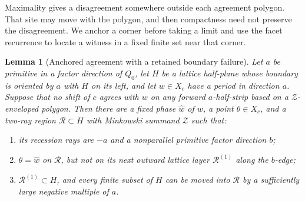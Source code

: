 \documentclass[11pt]{article}
\numberwithin{equation}{section}
\newtheorem{lemma}[theorem]{Lemma}
\theoremstyle{definition}
\theoremstyle{remark}
\newcommand{\ZZ}{\mathcal Z}
\newcommand{\RR}{\mathcal R}
\begin{document}
Maximality gives a disagreement somewhere outside each agreement polygon. That site may move with
the polygon, and then compactness need not preserve the disagreement. We anchor a corner before
taking a limit and use the facet recurrence to locate a witness in a fixed finite set near that
corner.

\begin{lemma}[Anchored agreement with a retained boundary failure]\label{lem:anchored}
Let $a$ be primitive in a factor direction of $Q_0$, let $H$ be a lattice half-plane whose boundary
is oriented by $a$ with $H$ on its left, and let $w\in X_c$ have a period in direction $a$. Suppose
that no shift of $c$ agrees with $w$ on any forward $a$-half-strip based on a $\ZZ$-enveloped
polygon. Then there are a fixed phase $\widehat w$ of $w$, a point $\theta\in X_c$, and a two-ray
region $\RR\subset H$ with Minkowski summand $\ZZ$ such that:
\begin{enumerate}[label=(\roman*)]
\item its recession rays are $-a$ and a nonparallel primitive factor direction $b$;
\item $\theta=\widehat w$ on $\RR$, but not on its next outward lattice layer $\RR^{(1)}$ along the $b$-edge;
\item $\RR^{(1)}\subset H$, and every finite subset of $H$ can be moved into $\RR$ by a sufficiently large negative multiple of $a$.
\end{enumerate}
\end{lemma}
\end{document}
